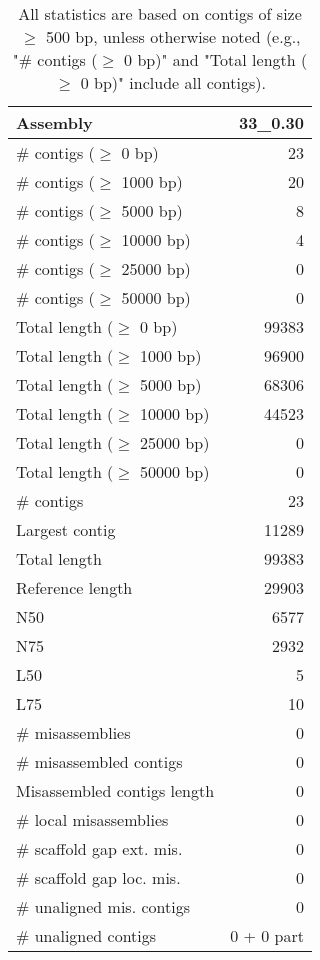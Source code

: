 \documentclass[12pt,a4paper]{article}
\begin{document}
\begin{table}[ht]
\begin{center}
\caption{All statistics are based on contigs of size $\geq$ 500 bp, unless otherwise noted (e.g., "\# contigs ($\geq$ 0 bp)" and "Total length ($\geq$ 0 bp)" include all contigs).}
\begin{tabular}{|l*{1}{|r}|}
\hline
Assembly & 33\_0.30 \\ \hline
\# contigs ($\geq$ 0 bp) & 23 \\ \hline
\# contigs ($\geq$ 1000 bp) & 20 \\ \hline
\# contigs ($\geq$ 5000 bp) & 8 \\ \hline
\# contigs ($\geq$ 10000 bp) & 4 \\ \hline
\# contigs ($\geq$ 25000 bp) & 0 \\ \hline
\# contigs ($\geq$ 50000 bp) & 0 \\ \hline
Total length ($\geq$ 0 bp) & 99383 \\ \hline
Total length ($\geq$ 1000 bp) & 96900 \\ \hline
Total length ($\geq$ 5000 bp) & 68306 \\ \hline
Total length ($\geq$ 10000 bp) & 44523 \\ \hline
Total length ($\geq$ 25000 bp) & 0 \\ \hline
Total length ($\geq$ 50000 bp) & 0 \\ \hline
\# contigs & 23 \\ \hline
Largest contig & 11289 \\ \hline
Total length & 99383 \\ \hline
Reference length & 29903 \\ \hline
N50 & 6577 \\ \hline
N75 & 2932 \\ \hline
L50 & 5 \\ \hline
L75 & 10 \\ \hline
\# misassemblies & 0 \\ \hline
\# misassembled contigs & 0 \\ \hline
Misassembled contigs length & 0 \\ \hline
\# local misassemblies & 0 \\ \hline
\# scaffold gap ext. mis. & 0 \\ \hline
\# scaffold gap loc. mis. & 0 \\ \hline
\# unaligned mis. contigs & 0 \\ \hline
\# unaligned contigs & 0 + 0 part \\ \hline

\end{tabular}
\end{center}
\end{table}
\end{document}
